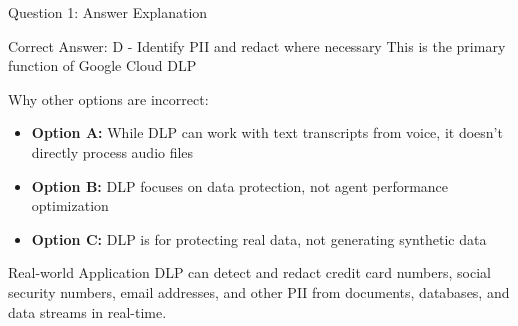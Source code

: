 \documentclass[aspectratio=169]{beamer}
\begin{document}
\begin{frame}{Question 1: Answer Explanation}
    \begin{alertblock}{Correct Answer: D - Identify PII and redact where necessary}
        \textcolor{googlegreen}{\faCheckCircle} This is the primary function of Google Cloud DLP
    \end{alertblock}
    
    \begin{block}{Why other options are incorrect:}
        \begin{itemize}
            \item[\textcolor{googlered}{\faTimes}] \textbf{Option A:} While DLP can work with text transcripts from voice, it doesn't directly process audio files
            \item[\textcolor{googlered}{\faTimes}] \textbf{Option B:} DLP focuses on data protection, not agent performance optimization
            \item[\textcolor{googlered}{\faTimes}] \textbf{Option C:} DLP is for protecting real data, not generating synthetic data
        \end{itemize}
    \end{block}
    
    \begin{exampleblock}{Real-world Application}
        DLP can detect and redact credit card numbers, social security numbers, email addresses, and other PII from documents, databases, and data streams in real-time.
    \end{exampleblock}
\end{frame}
\end{document}
